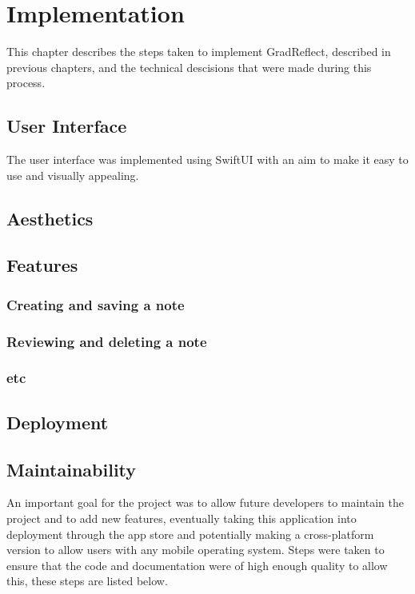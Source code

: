 \documentclass{l4proj}
\begin{document}
\chapter{Implementation} \label{implementation}

This chapter describes the steps taken to implement GradReflect, described in previous chapters, and the technical descisions that were made during this process.

\section{User Interface}

The user interface was implemented using SwiftUI with an aim to make it easy to use and visually appealing.

\section{Aesthetics}

\section{Features}

\subsection{Creating and saving a note}

\subsection{Reviewing and deleting a note}

\subsection{etc}

\section{Deployment}

\section{Maintainability}
An important goal for the project was to allow future developers to maintain the project and to add new features, eventually taking this application into 
deployment through the app store and potentially making a cross-platform version to allow users with any mobile operating system. Steps were taken to ensure that 
the code and documentation were of high enough quality to allow this, these steps are listed below.
\end{document}
